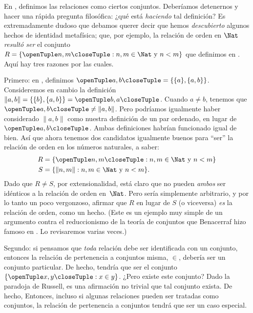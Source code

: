 \documentclass[../../../include/open-logic-section]{subfiles}
\begin{document}

En , definimos las relaciones como ciertos conjuntos. Deberíamos
detenernos y hacer una rápida pregunta filosófica: ¿qué está \emph{haciendo} tal
definición? Es extremadamente dudoso que debamos querer decir que hemos
\emph{descubierto} algunos hechos de identidad metafísica; que, por ejemplo, la relación de orden en $\Nat$ \emph{resultó ser} el conjunto $R= \Setabs{\tuple{n,m}}{n, m \in \Nat\text{ y } n < m}$ que definimos en . Aquí hay tres
razones por las cuales.

Primero: en , definimos $\tuple{a, b} = \{\{a\}, \{a, b\}\}$. Consideremos en cambio la definición $\lVert a,
b\rVert = \{\{b\}, \{a, b\}\} = \tuple{b,a}$. Cuando $a \neq b$, tenemos que $\tuple{a, b} \neq \lVert a,b\rVert$. Pero podríamos igualmente haber considerado $\lVert a,b\rVert$ como nuestra definición de un par ordenado, en lugar de $\tuple{a,b}$. Ambas definiciones habrían funcionado igual de bien. Así que ahora tenemos dos candidatos igualmente buenos para ``ser'' la relación de orden en los números naturales, a saber:
\begin{align*}
		R &= \Setabs{\tuple{n,m}}{n, m \in \Nat \text{ y }n < m}\\
		S &= \Setabs{\lVert n,m\rVert}{n, m \in \Nat \text{ y }n < m}.
\end{align*}
Dado que $R \neq S$, por extensionalidad, está claro que no pueden \emph{ambos} ser idénticos a la relación de orden en~$\Nat$. Pero sería simplemente arbitrario, y por lo tanto un poco vergonzoso, afirmar que $R$ en lugar de $S$ (o viceversa) \emph{es} la relación de orden, como un hecho. (Este es un ejemplo muy simple de un argumento contra el reduccionismo de la teoría de conjuntos que Benacerraf hizo famoso en \citeyear{Benacerraf1965}. Lo revisaremos varias veces.)

Segundo: si pensamos que \emph{toda} relación debe ser identificada con un conjunto, entonces la relación de pertenencia a conjuntos misma, $\in$, debería ser un conjunto particular. De hecho, tendría que ser el conjunto $\Setabs{\tuple{x,y}}{x \in y}$. ¿Pero existe este conjunto? Dado la paradoja de Russell, es una afirmación no trivial que tal conjunto exista. De hecho, 
Entonces, incluso si algunas relaciones pueden ser tratadas como conjuntos, la relación de pertenencia a conjuntos tendrá que ser un caso especial.
\end{document}
